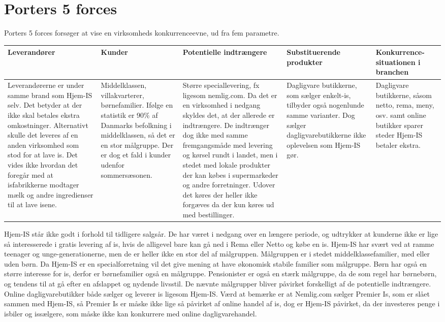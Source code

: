 \section{Porters 5 forces}
Porters 5 forces\cite{Organisation} forsøger at vise en virksomheds konkurrenceevne, ud fra fem parametre. 
\begin{center}
\begin{tabular}{ |p{80pt}|p{80pt}|p{80pt}|p{80pt}|p{80pt}| }
   \hline
   Leverandører & Kunder & Potentielle indtrængere & Substituerende produkter & Konkurrence-situationen i branchen \\
   \hline\hline
   Leverandørerne er under samme brand som Hjem-IS selv. Det betyder at der ikke skal betales ekstra omkostninger. Alternativt skulle det leveres af en anden virksomhed som stod for at lave is.
	Det vides ikke hvordan det foregår med at isfabrikkerne modtager mælk og andre ingredienser til at lave isene.
	&
	Middelklassen, villakvarterer, børnefamilier.
	Ifølge en statistik er 90\% af Danmarks befolkning i middelklassen, så det er en stor målgruppe. Der er dog et fald i kunder udenfor sommersæsonen.
	&
	Større speciallevering, fx ligesom nemlig.com.
	Da det er en virksomhed i nedgang skyldes det, at der allerede er indtrængere. De indtrænger dog ikke med samme fremgangsmåde med levering og kørsel rundt i landet, men i stedet med lokale produkter der kan købes i supermarkeder og andre forretninger. Udover det køres der heller ikke forgæves da der kun køres ud med bestillinger.
	&
	Dagligvare butikkerne, som sælger enkelt-is, tilbyder også nogenlunde samme varianter. Dog sælger dagligvarebutikkerne ikke oplevelsen som Hjem-IS gør.
	&
	Dagligvare butikkerne, såsom netto, rema, meny, osv. samt online butikker sparer steder Hjem-IS betaler ekstra.
	\\
	\hline
\end{tabular}
\end{center}

Hjem-IS står ikke godt i forhold til tidligere salgsår. De har været i nedgang over en længere periode, og udtrykker at kunderne ikke er lige så interesserede i gratis levering af is, hvis de alligevel bare kan gå ned i Rema eller Netto og købe en is. Hjem-IS har svært ved at ramme teenager og unge-generationerne, men de er heller ikke en stor del af målgruppen. Målgruppen er i stedet middelklassefamilier, med eller uden børn. Da Hjem-IS er en specialforretning vil det give mening at have økonomisk stabile familier som målgruppe. Børn har også en større interesse for is, derfor er børnefamilier også en målgruppe. Pensionister er også en stærk målgruppe, da de som regel har børnebørn, og tendens til at gå efter en afslappet og nydende livsstil. 
De nævnte målgrupper bliver påvirket forskelligt af de potentielle indtrængere. Online dagligvarebutikker både sælger og leverer is ligesom Hjem-IS. Værd at bemærke er at Nemlig.com sælger Premier Is, som er slået sammen med Hjem-IS, så Premier Is er måske ikke lige så påvirket af online handel af is, dog er Hjem-IS påvirket, da der investeres penge i isbiler og issælgere, som måske ikke kan konkurrere med online dagligvarehandel.

